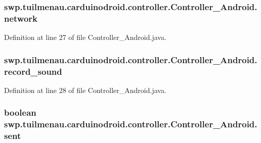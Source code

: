 \subsubsection[{network}]{ swp.\+tuilmenau.\+carduinodroid.\+controller.\+Controller\+\_\+\+Android.\+network}\label{classswp_1_1tuilmenau_1_1carduinodroid_1_1controller_1_1_controller___android_af5434f7f5f8bc92b5679c36e18bcc155}


Definition at line 27 of file Controller\+\_\+\+Android.\+java.

\hypertarget{classswp_1_1tuilmenau_1_1carduinodroid_1_1controller_1_1_controller___android_a11fa9264c7b83ed60b2c3f891b9f95cb}{}
\subsubsection[{record\+\_\+sound}]{ swp.\+tuilmenau.\+carduinodroid.\+controller.\+Controller\+\_\+\+Android.\+record\+\_\+sound}\label{classswp_1_1tuilmenau_1_1carduinodroid_1_1controller_1_1_controller___android_a11fa9264c7b83ed60b2c3f891b9f95cb}


Definition at line 28 of file Controller\+\_\+\+Android.\+java.

\hypertarget{classswp_1_1tuilmenau_1_1carduinodroid_1_1controller_1_1_controller___android_a134514a0d10e27e6c3c1521b08b2d041}{}
\subsubsection[{sent}]{\setlength{\rightskip}{0pt plus 5cm}boolean swp.\+tuilmenau.\+carduinodroid.\+controller.\+Controller\+\_\+\+Android.\+sent}\label{classswp_1_1tuilmenau_1_1carduinodroid_1_1controller_1_1_controller___android_a134514a0d10e27e6c3c1521b08b2d041}


